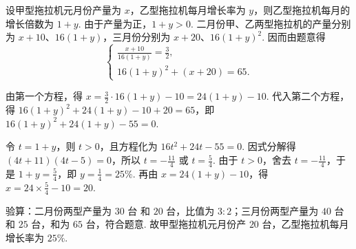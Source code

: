 \begin{solution}
设甲型拖拉机元月份产量为 \(x\)，乙型拖拉机每月增长率为 \(y\)，则乙型拖拉机每月的增长倍数为 \(1+y\). 由于产量为正，\(1+y>0\). 二月份甲、乙两型拖拉机的产量分别为 \(x+10\)、\(16(1+y)\)，三月份分别为 \(x+20\)、\(16(1+y)^2\). 因而由题意得
\[
\begin{cases}
\frac{x+10}{16\left(1+y\right)}=\frac{3}{2},\\
16\left(1+y\right)^2+\left(x+20\right)=65.
\end{cases}
\]

由第一个方程，得
\(x=\frac{3}{2}\cdot16\left(1+y\right)-10=24\left(1+y\right)-10\). 代入第二个方程，得
\(16\left(1+y\right)^2+24\left(1+y\right)-10+20=65\)，即
\(16\left(1+y\right)^2+24\left(1+y\right)-55=0\).

令 \(t=1+y\)，则 \(t>0\)，且方程化为 \(16t^2+24t-55=0\). 因式分解得
\(\left(4t+11\right)\left(4t-5\right)=0\)，所以 \(t=-\frac{11}{4}\) 或 \(t=\frac{5}{4}\). 由于 \(t>0\)，舍去 \(t=-\frac{11}{4}\)，于是
\(1+y=\frac{5}{4}\)，即 \(y=\frac{1}{4}=25\%\). 再由 \(x=24\left(1+y\right)-10\)，得 \(x=24\times\frac{5}{4}-10=20\).

验算：二月份两型产量为 \(30\text{ 台}\) 和 \(20\text{ 台}\)，比值为 \(3:2\)；三月份两型产量为 \(40\text{ 台}\) 和 \(25\text{ 台}\)，和为 \(65\text{ 台}\)，符合题意. 故甲型拖拉机元月份产 \(20\text{ 台}\)，乙型拖拉机每月增长率为 \(25\%\).
\end{solution}
